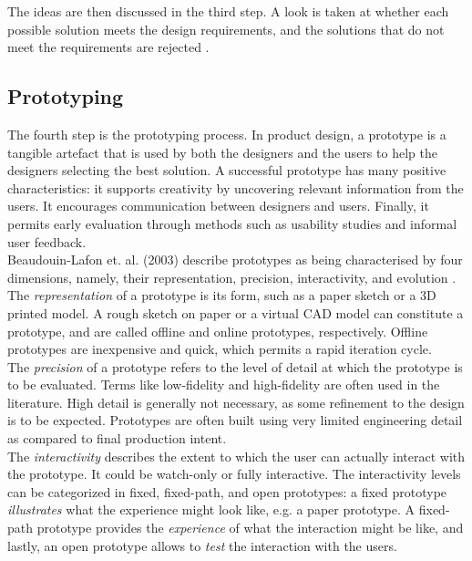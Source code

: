 The ideas are then discussed in the third step. A look is taken at whether each possible solution meets the design requirements, and the solutions that do not meet the requirements are rejected \cite{wikiBrainstorm}. \\

\subsection{Prototyping}
\label{section-prototyping}

The fourth step is the prototyping process. In product design, a prototype is a tangible artefact that is used by both the designers and the users to help the designers selecting the best solution. A successful prototype has many positive characteristics: it supports creativity by uncovering relevant information from the users. It encourages communication between designers and users. Finally, it permits early evaluation through methods such as usability studies and informal user feedback. \\

Beaudouin-Lafon et. al. (2003) describe prototypes as being characterised by four dimensions, namely, their representation, precision, interactivity, and evolution \cite{Beaudouin-Lafon}. \\

The \emph{representation} of a prototype is its form, such as a paper sketch or a 3D printed model. A rough sketch on paper or a virtual CAD model can constitute a prototype, and are called offline and online prototypes, respectively. Offline prototypes are inexpensive and quick, which permits a rapid iteration cycle. \\

The \emph{precision} of a prototype refers to the level of detail at which the prototype is to be evaluated. Terms like low-fidelity and high-fidelity are often used in the literature. High detail is generally not necessary, as some refinement to the design is to be expected. Prototypes are often built using very limited engineering detail as compared to final production intent. \\

The \emph{interactivity} describes the extent to which the user can actually interact with the prototype. It could be watch-only or fully interactive. The interactivity levels can be categorized in fixed, fixed-path, and open prototypes: a fixed prototype \emph{illustrates} what the experience might look like, e.g. a paper prototype. A fixed-path prototype provides the \emph{experience} of what the interaction might be like, and lastly, an open prototype allows to \emph{test} the interaction with the users. \\

